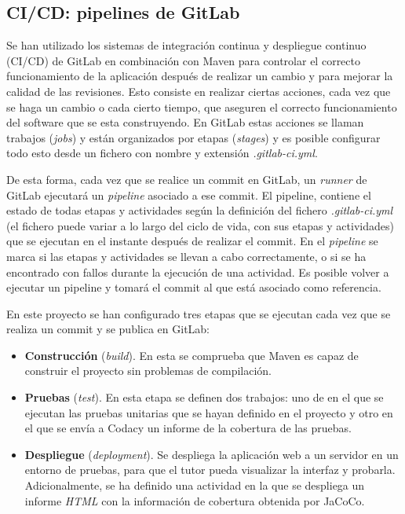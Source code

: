 \subsection{CI/CD: pipelines de GitLab}\label{sect:5_4_1_CICD}

Se han utilizado los sistemas de integración continua y despliegue continuo (CI/CD) de GitLab en combinación con Maven para controlar el correcto funcionamiento de la aplicación después de realizar un cambio y para mejorar la calidad de las revisiones. Esto consiste en realizar ciertas acciones, cada vez que se haga un cambio o cada cierto tiempo, que aseguren el correcto funcionamiento del software que se esta construyendo. En GitLab estas acciones se llaman trabajos (\textit{jobs}) y están organizados por etapas (\textit{stages}) y es posible configurar todo esto desde un fichero con nombre y extensión \textit{.gitlab-ci.yml}. 

De esta forma, cada vez que se realice un commit en GitLab, un \textit{runner} de GitLab ejecutará un \textit{pipeline} asociado a ese commit. El pipeline, contiene el estado de todas etapas y actividades según la definición del fichero \textit{.gitlab-ci.yml} (el fichero puede variar a lo largo del ciclo de vida, con sus etapas y actividades) que se ejecutan en el instante después de realizar el commit. En el \textit{pipeline} se marca si las etapas y actividades se llevan a cabo correctamente, o si se ha encontrado con fallos durante la ejecución de una actividad. Es posible volver a ejecutar un pipeline y tomará el commit al que está asociado como referencia.

En este proyecto se han configurado tres etapas que se ejecutan cada vez que se realiza un commit y se publica en GitLab:
\begin{itemize}
	\item \textbf{Construcción} (\textit{build}). En esta se comprueba que Maven es capaz de construir el proyecto sin problemas de compilación.
	\item \textbf{Pruebas} (\textit{test}). En esta etapa se definen dos trabajos: uno de en el que se ejecutan las pruebas unitarias que se hayan definido en el proyecto y otro en el que se envía a Codacy un informe de la cobertura de las pruebas.
	\item \textbf{Despliegue} (\textit{deployment}). Se despliega la aplicación web a un servidor en un entorno de pruebas, para que el tutor pueda visualizar la interfaz y probarla. Adicionalmente, se ha definido una actividad en la que se despliega un informe \textit{HTML} con la información de cobertura obtenida por JaCoCo.
\end{itemize}

